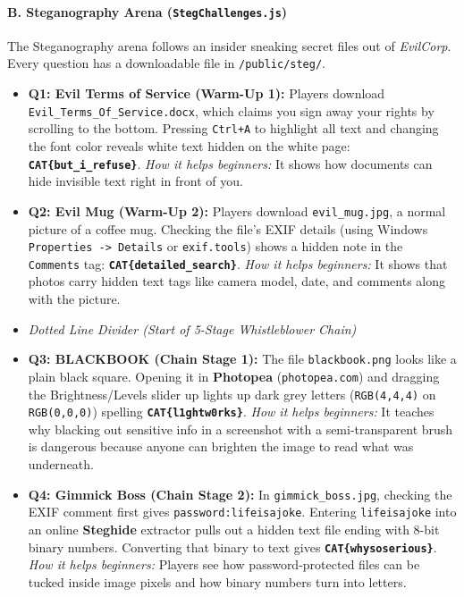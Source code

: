 \documentclass[11pt,a4paper]{article}
\begin{document}
\paragraph{B. Steganography Arena (\texttt{StegChallenges.js})}
The Steganography arena follows an insider sneaking secret files out of \textit{EvilCorp}. Every question has a downloadable file in \texttt{/public/steg/}.
\begin{itemize}
    \item \textbf{Q1: Evil Terms of Service (Warm-Up 1):} Players download \texttt{Evil\_Terms\_\allowbreak Of\_Service.docx}, which claims you sign away your rights by scrolling to the bottom. Pressing \texttt{Ctrl+A} to highlight all text and changing the font color reveals white text hidden on the white page: \textbf{\texttt{CAT\{but\_i\_refuse\}}}. \textit{How it helps beginners:} It shows how documents can hide invisible text right in front of you.
    \item \textbf{Q2: Evil Mug (Warm-Up 2):} Players download \texttt{evil\_mug.jpg}, a normal picture of a coffee mug. Checking the file's EXIF details (using Windows \texttt{Properties -> Details} or \texttt{exif.tools}) shows a hidden note in the \texttt{Comments} tag: \textbf{\texttt{CAT\{detailed\_\allowbreak search\}}}. \textit{How it helps beginners:} It shows that photos carry hidden text tags like camera model, date, and comments along with the picture.
    \item \textit{Dotted Line Divider (Start of 5-Stage Whistleblower Chain)}
    \item \textbf{Q3: BLACKBOOK (Chain Stage 1):} The file \texttt{blackbook.png} looks like a plain black square. Opening it in \textbf{Photopea} (\texttt{photopea.com}) and dragging the Brightness/Levels slider up lights up dark grey letters (\texttt{RGB(4,4,4)} on \texttt{RGB(0,0,0)}) spelling \textbf{\texttt{CAT\{l1ghtw0rks\}}}. \textit{How it helps beginners:} It teaches why blacking out sensitive info in a screenshot with a semi-transparent brush is dangerous because anyone can brighten the image to read what was underneath.
    \item \textbf{Q4: Gimmick Boss (Chain Stage 2):} In \texttt{gimmick\_boss.jpg}, checking the EXIF comment first gives \texttt{password:lifeisajoke}. Entering \texttt{lifeisajoke} into an online \textbf{Steghide} extractor pulls out a hidden text file ending with 8-bit binary numbers. Converting that binary to text gives \textbf{\texttt{CAT\{whysoserious\}}}. \textit{How it helps beginners:} Players see how password-protected files can be tucked inside image pixels and how binary numbers turn into letters.

\end{itemize}
\end{document}
